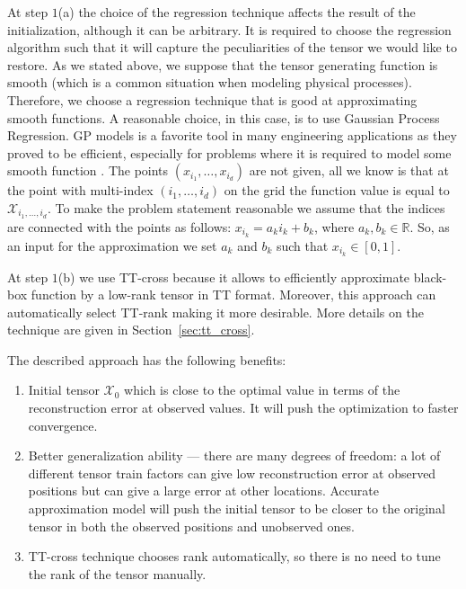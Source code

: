 At step $1$(a) the choice of the regression technique affects
the result of the initialization, although it can be arbitrary.
It is required to choose the regression algorithm such that it will capture the peculiarities of the tensor we would like to restore.
As we stated above, we suppose that the tensor generating function is smooth
(which is a common situation when modeling physical processes).
Therefore, we choose a regression technique that is good at approximating smooth functions.
A reasonable choice, in this case, is to use Gaussian Process Regression.
GP models is a favorite tool in many engineering applications as they
proved to be efficient, especially for problems where it is required to
model some smooth function \citep{belyaev2016gtapprox}.
The points $(x_{i_1}, \ldots, x_{i_d})$ are not given, all we know is that at the point with multi-index
$(i_1, \ldots, i_d)$ on the grid the function value
is equal to $\mathcal{X}_{i_1, \ldots, i_d}$.
To make the problem statement reasonable we assume that
the indices are connected with the points as follows:
$x_{i_k} = a_k i_k + b_k$,
where $a_k, b_k \in \mathbb{R}$.
So, as an input for the approximation we set $a_k$ and $b_k$ such that $x_{i_k} \in [0, 1]$.

At step $1$(b) we use TT-cross
because it allows to efficiently approximate black-box function by a low-rank tensor in TT format.
Moreover, this approach can automatically select TT-rank making it more desirable.
More details on the technique are given in Section~\ref{sec:tt_cross}.

The described approach has the following benefits:
\begin{enumerate}
    \item Initial tensor $\mathcal{X}_0$ which is close to the optimal value in terms of the reconstruction error at observed values.
    It will push the optimization to faster convergence.
    \item Better generalization ability --- there are many degrees of freedom: a lot of different tensor train factors can give low reconstruction error at observed positions but can give a large error at other locations.
    Accurate approximation model will push the initial tensor to be closer to the original tensor in both the observed positions and unobserved ones.
    \item TT-cross technique chooses rank automatically, so there is no need to tune the rank of the tensor manually.
\end{enumerate}

